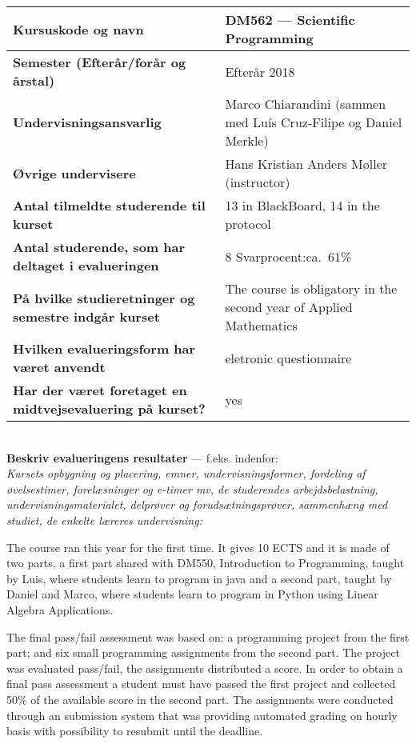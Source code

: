 \documentclass[11pt]{article}
\begin{document}
\tabulinesep=1.2mm
\begin{tabu} to 1.0 \hline
Kursuskode og navn &  DM562 --- Scientific Programming \\\hline
Semester {\normalfont (Efterår/forår og årstal)} & Efterår 2018 \\\hline
Undervisnings\-ansvarlig &  Marco Chiarandini (sammen med Luís Cruz-Filipe og Daniel Merkle) \\\hline
Øvrige undervisere &  Hans Kristian Anders Møller (instructor) \\\hline
Antal tilmeldte studerende til kurset & 13 in BlackBoard, 14 in the protocol \\\hline
Antal studerende, som har deltaget i evalueringen &  8  \hfill
Svarprocent:ca.~61\% \\\hline
På hvilke studieretninger og semestre indgår kurset &  The course is obligatory in the second year of Applied Mathematics \\\hline
Hvilken evalueringsform har været anvendt &  eletronic questionnaire \\\hline
Har der været foretaget en midtvejsevaluering på kurset? &  yes  \\ 
\hline
\end{tabu}

~\\[1cm]\textcolor{sdublue}{{\bf Beskriv evalueringens resultater} ---
  f.eks. indenfor:\\ {\small \em Kursets opbygning og placering,
    emner, undervisningsformer, fordeling af øvelsestimer,
    forelæsninger og e-timer mv, de studerendes arbejdsbelastning,
    undervisningsmaterialet, delprøver og forudsætningsprøver,
    sammenhæng med studiet, de enkelte læreres undervisning:}}



The course ran this year for the first time. It gives 10 ECTS and it
is made of two parts, a first part shared with DM550, Introduction to
Programming, taught by Luis, where students learn to program in java
and a second part, taught by Daniel and Marco, where students learn to
program in Python using Linear Algebra Applications.

The final pass/fail assessment was based on: a programming project from
the first part; and six small programming assignments from the second
part. The project was evaluated pass/fail, the assignments distributed a
score. In order to obtain a final pass assessment a student must have
passed the first project and collected 50\% of the available score in
the second part. The assignments were conducted through an submission
system that was providing automated grading on hourly basis with
possibility to resubmit until the deadline.
\end{document}
